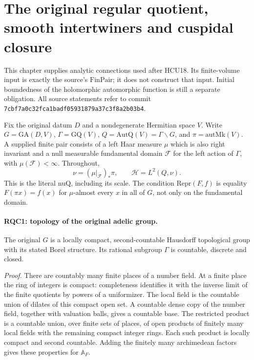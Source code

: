 \section{The original regular quotient, smooth intertwiners and cuspidal closure}
\label{sec:regular-quotient}

This chapter supplies analytic connections used after HCU18.
Its finite-volume input is exactly the source's \(\mathrm{FinPair}\);
it does not construct that input.  Initial boundedness of the
holomorphic automorphic function is still a separate obligation.
All source statements refer to commit
\texttt{7cbf7a0c32fca1badf05931879a37c3f8a2b03b4}.

Fix the original datum \(D\) and a nondegenerate Hermitian space \(V\).
Write \(G=\mathrm{GA}(D,V)\), \(\Gamma=\mathrm{GQ}(V)\),
\(Q=\mathrm{AutQ}(V)=\Gamma\backslash G\), and
\(\pi=\mathrm{autMk}(V)\).  A supplied finite pair consists of a
left Haar measure \(\mu\) which is also right invariant and a null
measurable fundamental domain \(\mathcal F\) for the left action of
\(\Gamma\), with \(\mu(\mathcal F)<\infty\).  Throughout,
\[
 \nu=(\mu|_{\mathcal F})_*\pi,\qquad
 \mathcal H=L^2(Q,\nu).
 \tag{RQC.1}
\]
This is the literal \(\mathrm{nuQ}\), including its scale.
The condition \(\mathrm{Repr}(F,f)\) is equality
\(F(\pi x)=f(x)\) for \(\mu\)-almost every \(x\) in all of \(G\),
not only on the fundamental domain.

\paragraph{RQC1: topology of the original adelic group.}
\label{claim:RQC1}
The original \(G\) is a locally compact, second-countable Hausdorff
topological group with its stated Borel structure.  Its rational
subgroup \(\Gamma\) is countable, discrete and closed.

\emph{Proof.}
There are countably many finite places of a number field.  At a finite
place the ring of integers is compact: completeness identifies it
with the inverse limit of the finite quotients by powers of a
uniformizer.  The local field is the countable union of dilates of
this compact open set.  A countable dense copy of the number field,
together with valuation balls, gives a countable base.  The
restricted product is a countable union, over finite sets of places,
of open products of finitely many local fields with the remaining
compact integer rings.  Each such product is locally compact and
second countable.  Adding the finitely many archimedean factors
gives these properties for \(\mathbb A_F\).

